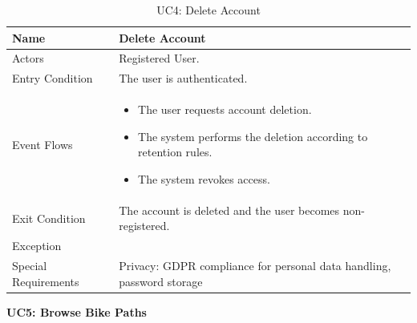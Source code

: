 \begin{table}[H]
    \centering
    \renewcommand{\arraystretch}{1.3}
    \begin{tabular}{|p{}|p{}|}
        \hline
        Name & \textbf{Delete Account} \\
        \hline
        Actors & Registered User. \\
        \hline
        Entry Condition & The user is authenticated. \\
        \hline
        Event Flows & \begin{itemize}[topsep=0pt, partopsep=0pt, leftmargin=*]
            \item The user requests account deletion.
            \item The system performs the deletion according to retention rules.
            \item The system revokes access.
        \end{itemize} \\
        \hline
        Exit Condition & The account is deleted and the user becomes non-registered. \\
        \hline
        Exception & \\
        \hline
        Special Requirements & Privacy: GDPR compliance for personal data handling, password storage \\
        \hline
    \end{tabular}
    \caption{UC4: Delete Account}
    \label{uc4}
\end{table}

\newpage
\noindent
\textbf{UC5: Browse Bike Paths}

